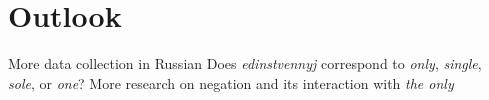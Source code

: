\documentclass{article}
\newcommand{\citegen}[1]{\citeauthor{#1}'s~(\citeyear{#1})}
\begin{document}
\begin{comment}
\subsection*{\citet{cb2015}}
\citegen{cb2015} proposal for the semantics of definites in English:

\begin{itemize}
	\item Definite descriptions are predicative (type $\langle e, t \rangle$).
	\item The indefinite and definite articles are identity functions. The definite article carries a weak uniqueness presupposition.
	\item Definite descriptions receive determinate meaning and argumental status through type-shifting \`{a} la \citet{partee86}.
\end{itemize}

\section{\textit{Only}, \textit{sole}, \textit{single} and \textit{one}}
Diagnostics adapted from \citet{cb2012a}.

\begin{exe}
	\ex \textbf{With indefinite article}: This company has a(n) (*only/sole/single/*one) director.
	\ex \textbf{With superlative}: Climate change is the (*only/?sole/single/??one) greatest threat to human life.
	\ex \textbf{With plural NP}: They are the (only/sole/*single/*one) people I trust.
	\ex \textbf{Licensing of NPIs}: The (only/?sole/??single/?one) truck I ever drove was red.
	\ex \textbf{DP negation}: Not a(n) (*only/sole/single/*one) person showed up.
\end{exe}

\noindent In summary:\\

\begin{tabular}{ c | c c c c c }
	& indefinite article & superlative & plural & licenses NPIs & DP negation \\
	\hline
	\textit{only} & no & no & yes & yes & no \\
	\textit{sole} & yes & yes & yes & yes & yes \\
	\textit{single} & yes & yes & no & marginal & yes \\
	\textit{one} & no & marginal & no & yes & no \\
\end{tabular}

Applying these diagnostics for Russian suggests that \textit{edinstvennyj}
\end{comment}

\section{Outlook}
\begin{itemize}
	\ex More data collection in Russian
	\ex Does \textit{edinstvennyj} correspond to \textit{only}, \textit{single}, \textit{sole}, or \textit{one}?
	\ex More research on negation and its interaction with \textit{the only}
\end{itemize}


\end{document}
